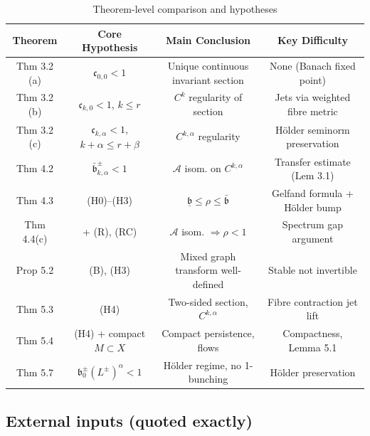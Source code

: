 \documentclass[11pt,a4paper]{article}
\theoremstyle{plain}
\theoremstyle{definition}
\theoremstyle{remark}
\numberwithin{equation}{section}
\numberwithin{figure}{section}
\begin{document}
\begin{table}[h]
\centering
\begin{tabular}{c|c|c|c}
\toprule
Theorem & Core Hypothesis & Main Conclusion & Key Difficulty\\
\midrule
Thm 3.2 (a) & $\mathfrak c_{0,0}<1$ & Unique continuous invariant section & None (Banach fixed point)\\
Thm 3.2 (b) & $\mathfrak c_{k,0}<1$, $k\le r$ & $C^k$ regularity of section & Jets via weighted fibre metric\\
Thm 3.2 (c) & $\mathfrak c_{k,\alpha}<1$, $k+\alpha\le r+\beta$ & $C^{k,\alpha}$ regularity & Hölder seminorm preservation\\
Thm 4.2 & $\bar{\mathfrak b}^\pm_{k,\alpha}<1$ & $\mathcal A$ isom. on $C^{k,\alpha}$ & Transfer estimate (Lem 3.1)\\
Thm 4.3 & (H0)–(H3) & $\underline{\mathfrak b}\le\rho\le\bar{\mathfrak b}$ & Gelfand formula + Hölder bump\\
Thm 4.4(c) & + (R), (RC) & $\mathcal A$ isom. $\Rightarrow\rho<1$ & Spectrum gap argument\\
Prop 5.2 & (B), (H3) & Mixed graph transform well-defined & Stable not invertible\\
Thm 5.3 & (H4) & Two-sided section, $C^{k,\alpha}$ & Fibre contraction jet lift\\
Thm 5.4 & (H4) + compact $M\subset X$ & Compact persistence, flows & Compactness, Lemma 5.1\\
Thm 5.7 & $\mathfrak b_0^\pm(L^\pm)^\alpha<1$ & Hölder regime, no 1-bunching & Hölder preservation\\
\bottomrule
\end{tabular}
\caption{Theorem-level comparison and hypotheses}
\label{tab:table1a}
\end{table}

\subsection{External inputs (quoted exactly)}
\end{document}
